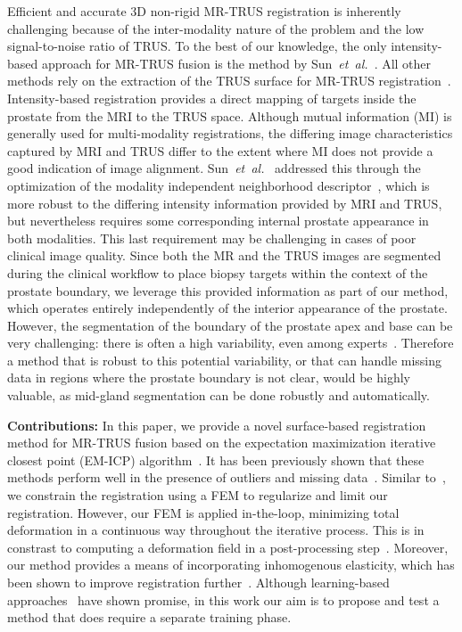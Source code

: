 \documentclass[runningheads,a4paper]{llncs}
\begin{document}
Efficient and accurate 3D non-rigid MR-TRUS registration is inherently challenging because of the inter-modality nature of the problem and the low signal-to-noise ratio of TRUS. To the best of our knowledge, the only intensity-based approach for MR-TRUS fusion is the method by Sun~\textit{et~al.}~\cite{Sun13a}.  All other methods rely on the extraction of the TRUS surface for MR-TRUS registration~\cite{Cool11a,Hu12a,Moradi12a,Xu2007a}.  Intensity-based registration provides a direct mapping of targets inside the prostate from the MRI to the TRUS space. Although mutual information (MI) is generally used for multi-modality registrations, the differing image characteristics captured by MRI and TRUS differ to the extent where MI does not provide a good indication of image alignment. Sun~\textit{et~al.}~\cite{Sun13a} addressed this through the optimization of the modality independent neighborhood descriptor~\cite{Heinrich12a}, which is more robust to the differing intensity information provided by MRI and TRUS, but nevertheless requires some corresponding internal prostate appearance in both modalities.  This last requirement may be challenging in cases of poor clinical image quality. Since both the MR and the TRUS images are segmented during the clinical workflow to place biopsy targets within the context of the prostate boundary, we leverage this provided information as part of our method, which operates entirely independently of the interior appearance of the prostate. However, the segmentation of the boundary of the prostate apex and base can be very challenging: there is often a high variability, even among experts~\cite{Smith07a}. Therefore a method that is robust to this potential variability, or that can handle missing data in regions where the prostate boundary is not clear, would be highly valuable, as mid-gland segmentation can be done robustly and automatically.
\smallskip

\noindent\textbf{Contributions:} In this paper, we provide a novel surface-based registration method for MR-TRUS fusion based on the expectation maximization iterative closest point (EM-ICP) algorithm~\cite{Combes10a,Myronenko10a}.  It has been previously shown that these methods perform well in the presence of outliers and missing data~\cite{Myronenko10a}. Similar to~\cite{Hu12a,Moradi12a}, we constrain the registration using a FEM to regularize and limit our registration. However, our FEM is applied in-the-loop, minimizing total deformation in a continuous way throughout the iterative process.  This is in constrast to computing a deformation field in a post-processing step~\cite{Mitra12a,Moradi12a}. Moreover, our method provides a means of incorporating inhomogenous elasticity, which has been shown to improve registration further~\cite{Nir13a}. Although learning-based approaches~\cite{Hu12a} have shown promise, in this work our aim is to propose and test a method that does require a separate training phase.
\end{document}
